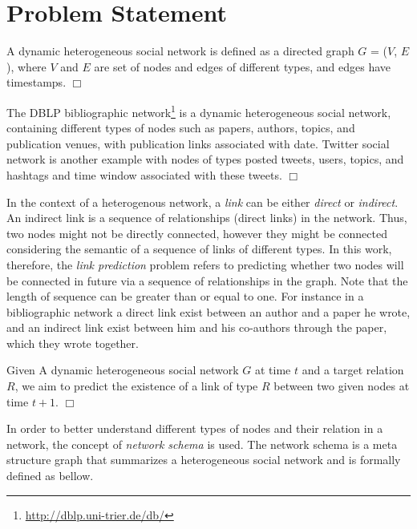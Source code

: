 \section{Problem Statement}

\begin{definition}
A dynamic heterogeneous social network is defined as a directed graph $G$ = ($V$, $E$), where $V$ and $E$ are set of nodes and edges of different types, and edges have timestamps. $\Box$
\end{definition}

\begin{example}
The DBLP bibliographic network\footnote{\url{http://dblp.uni-trier.de/db/}} is a dynamic heterogeneous social network, containing different types of nodes such as papers, authors, topics, and publication venues, with publication links associated with date. Twitter social network is another example with nodes of types posted tweets, users, topics, and hashtags and time window associated with these tweets. $\Box$
\end{example}

In the context of a heterogenous network, a \textit{link} can be either \textit{direct} or \textit{indirect}. An indirect link is a sequence of relationships (direct links) in the network. Thus, two nodes might not be directly connected, however they might be connected considering the semantic of a sequence of links of different types. In this work, therefore, the \textit{link prediction} problem refers to predicting whether two nodes will be connected in future via a sequence of relationships in the graph. Note that the length of sequence can be greater than or equal to one. For instance in a bibliographic network a direct link exist between an author and a paper he wrote, and an indirect link exist between him and his co-authors through the paper, which they wrote together.

\begin{definition}\label{problemdef}
 Given A dynamic heterogeneous social network $G$ at time $t$ and a target relation $R$, we aim to predict the existence of a link of type $R$ between two given nodes at time $t+1$. $\Box$
 \end{definition}

In order to better understand different types of nodes and their relation in a network, the concept of \textit{network schema} \cite{sun2011pathsim} is used. The network schema is a meta structure graph that summarizes a heterogeneous social network and is formally defined as bellow.

